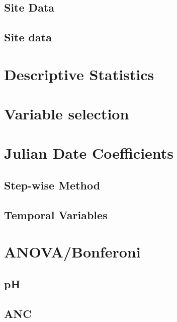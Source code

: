 \chapter{}

	\section{Site Data}
		

	\section{Site data}
		


\chapter{Descriptive Statistics}
	


\chapter{Variable selection}
	


\chapter{Julian Date Coefficients}
	\section{Step-wise Method}
		 

	\section{Temporal Variables}


\chapter{ANOVA/Bonferoni}\pagebreak
	\section{pH}
		
 
	\section{ANC}%
		

